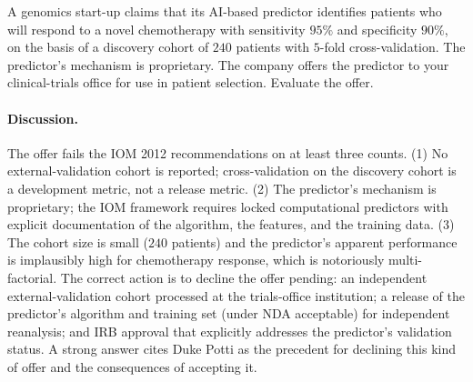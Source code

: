 \begin{exercise}
A genomics start-up claims that its AI-based predictor identifies
patients who will respond to a novel chemotherapy with sensitivity
$95\%$ and specificity $90\%$, on the basis of a discovery cohort of
$240$ patients with $5$-fold cross-validation. The predictor's
mechanism is proprietary. The company offers the predictor to your
clinical-trials office for use in patient selection. Evaluate the
offer.

\paragraph{Discussion.}
The offer fails the IOM 2012 recommendations on at least three counts.
(1) No external-validation cohort is reported; cross-validation on
the discovery cohort is a development metric, not a release metric.
(2) The predictor's mechanism is proprietary; the IOM framework
requires locked computational predictors with explicit documentation
of the algorithm, the features, and the training data. (3) The cohort
size is small ($240$ patients) and the predictor's apparent
performance is implausibly high for chemotherapy response, which is
notoriously multi-factorial. The correct action is to decline the
offer pending: an independent external-validation cohort processed at
the trials-office institution; a release of the predictor's algorithm
and training set (under NDA acceptable) for independent reanalysis;
and IRB approval that explicitly addresses the predictor's validation
status. A strong answer cites Duke Potti as the precedent for
declining this kind of offer and the consequences of accepting it.
\end{exercise}

